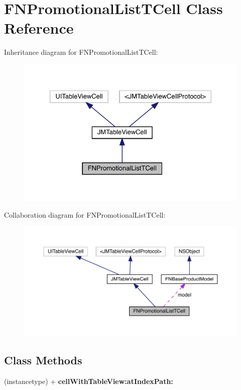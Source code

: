 \hypertarget{interface_f_n_promotional_list_t_cell}{}\section{F\+N\+Promotional\+List\+T\+Cell Class Reference}
\label{interface_f_n_promotional_list_t_cell}


Inheritance diagram for F\+N\+Promotional\+List\+T\+Cell\+:\nopagebreak
\begin{figure}[H]
\begin{center}
\leavevmode
\includegraphics[width=326pt]{interface_f_n_promotional_list_t_cell__inherit__graph}
\end{center}
\end{figure}


Collaboration diagram for F\+N\+Promotional\+List\+T\+Cell\+:\nopagebreak
\begin{figure}[H]
\begin{center}
\leavevmode
\includegraphics[width=350pt]{interface_f_n_promotional_list_t_cell__coll__graph}
\end{center}
\end{figure}
\subsection*{Class Methods}
\begin{DoxyCompactItemize}
\item 
\mbox{\label{interface_f_n_promotional_list_t_cell_a81572dac10a26b09d1df9135bd6e29b5}} 
(instancetype) + {\bfseries cell\+With\+Table\+View\+:at\+Index\+Path\+:}
\end{DoxyCompactItemize}
